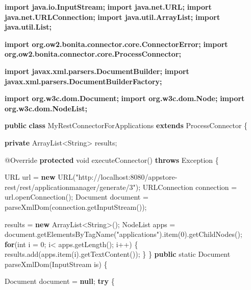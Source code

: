 \documentclass[]{report}
\newenvironment{Shaded}{}{}
\newcommand{\KeywordTok}[1]{\textcolor[rgb]{0.00,0.44,0.13}{\textbf{{#1}}}}
\newcommand{\DataTypeTok}[1]{\textcolor[rgb]{0.56,0.13,0.00}{{#1}}}
\newcommand{\DecValTok}[1]{\textcolor[rgb]{0.25,0.63,0.44}{{#1}}}
\newcommand{\StringTok}[1]{\textcolor[rgb]{0.25,0.44,0.63}{{#1}}}
\newcommand{\FunctionTok}[1]{\textcolor[rgb]{0.02,0.16,0.49}{{#1}}}
\newcommand{\NormalTok}[1]{{#1}}
\begin{document}
\begin{enumerate}
\begin{Shaded}
\begin{Highlighting}[]
\KeywordTok{import java.io.InputStream;}
\KeywordTok{import java.net.URL;}
\KeywordTok{import java.net.URLConnection;}
\KeywordTok{import java.util.ArrayList;}
\KeywordTok{import java.util.List;}

\KeywordTok{import org.ow2.bonita.connector.core.ConnectorError;}
\KeywordTok{import org.ow2.bonita.connector.core.ProcessConnector;}

\KeywordTok{import javax.xml.parsers.DocumentBuilder;}
\KeywordTok{import javax.xml.parsers.DocumentBuilderFactory;}

\KeywordTok{import org.w3c.dom.Document;}
\KeywordTok{import org.w3c.dom.Node;}
\KeywordTok{import org.w3c.dom.NodeList;}

\KeywordTok{public} \KeywordTok{class} \NormalTok{MyRestConnectorForApplications }\KeywordTok{extends} \NormalTok{ProcessConnector \{}

  \KeywordTok{private} \NormalTok{ArrayList<String> results;}

  \FunctionTok{@Override}
  \KeywordTok{protected} \DataTypeTok{void} \FunctionTok{executeConnector}\NormalTok{() }\KeywordTok{throws} \NormalTok{Exception \{}

    \NormalTok{URL url = }\KeywordTok{new} \NormalTok{URL(}\StringTok{"http://localhost:8080/appstore-rest/rest/applicationmanager/generate/3"}\NormalTok{);}
    \NormalTok{URLConnection connection = url.}\FunctionTok{openConnection}\NormalTok{();}
    \NormalTok{Document document = }\FunctionTok{parseXmlDom}\NormalTok{(connection.}\FunctionTok{getInputStream}\NormalTok{());}

    \NormalTok{results = }\KeywordTok{new} \NormalTok{ArrayList<String>();}
    \NormalTok{NodeList apps = document.}\FunctionTok{getElementsByTagName}\NormalTok{(}\StringTok{"applications"}\NormalTok{).}\FunctionTok{item}\NormalTok{(}\DecValTok{0}\NormalTok{).}\FunctionTok{getChildNodes}\NormalTok{();}
    \KeywordTok{for}\NormalTok{(}\DataTypeTok{int} \NormalTok{i = }\DecValTok{0}\NormalTok{; i< apps.}\FunctionTok{getLength}\NormalTok{(); i++) \{}
      \NormalTok{results.}\FunctionTok{add}\NormalTok{(apps.}\FunctionTok{item}\NormalTok{(i).}\FunctionTok{getTextContent}\NormalTok{());}
    \NormalTok{\}}
  \NormalTok{\}}
  \KeywordTok{public} \DataTypeTok{static} \NormalTok{Document }\FunctionTok{parseXmlDom}\NormalTok{(InputStream is) \{}

    \NormalTok{Document document = }\KeywordTok{null}\NormalTok{;}
    \KeywordTok{try} \NormalTok{\{}


\end{Highlighting}
\end{Shaded}
\end{enumerate}
\end{document}
